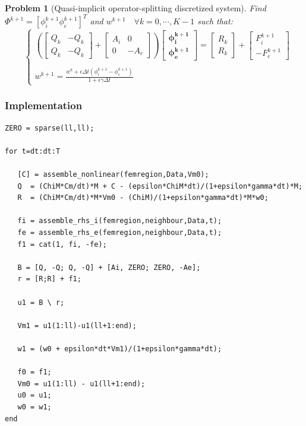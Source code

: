 \documentclass[a4paper,11pt]{article}
\newtheorem{problem}{Problem}
\begin{document}
\begin{problem} [Quasi-implicit operator-splitting discretized system]
Find $\Phi^{k+1}=[\phi_i^{k+1} \phi_e^{k+1}]^T$ and $w^{k+1} \quad \forall k=0, \cdots, K-1$ such that:
\begin{equation}
\quad
\begin{cases}
\left(
\begin{bmatrix} Q_k & -Q_k \\ Q_k & -Q_k \end{bmatrix} + 
\begin{bmatrix} A_i & 0 \\ 0 & -A_e\end{bmatrix}
\right)
\begin{bmatrix}
\bm{\phi_i^{k+1}} \\ \bm{\phi_e^{k+1}}
\end{bmatrix}
= \begin{bmatrix} R_k \\ R_k \end{bmatrix} + \begin{bmatrix} F_i^{k+1} \\  -F_e^{k+1}\end{bmatrix} \\ \\
w^{k+1} = \frac{\displaystyle w^k + \epsilon \Delta t (\phi_i^{k+1}-\phi_e^{k+1})}{\displaystyle 1+\epsilon \gamma \Delta t}
\end{cases}
\end{equation}
\end{problem}

\subsubsection{Implementation}
\begin{verbatim}
ZERO = sparse(ll,ll);
        
for t=dt:dt:T
        
   [C] = assemble_nonlinear(femregion,Data,Vm0);
   Q  = (ChiM*Cm/dt)*M + C - (epsilon*ChiM*dt)/(1+epsilon*gamma*dt)*M;
   R  = (ChiM*Cm/dt)*M*Vm0 - (ChiM)/(1+epsilon*gamma*dt)*M*w0;
    
   fi = assemble_rhs_i(femregion,neighbour,Data,t);
   fe = assemble_rhs_e(femregion,neighbour,Data,t);
   f1 = cat(1, fi, -fe);
    
   B = [Q, -Q; Q, -Q] + [Ai, ZERO; ZERO, -Ae];
   r = [R;R] + f1;
        
   u1 = B \ r; 
        
   Vm1 = u1(1:ll)-u1(ll+1:end);

   w1 = (w0 + epsilon*dt*Vm1)/(1+epsilon*gamma*dt);
    
   f0 = f1;
   Vm0 = u1(1:ll) - u1(ll+1:end);
   u0 = u1;
   w0 = w1;
end
\end{verbatim}
\end{document}
